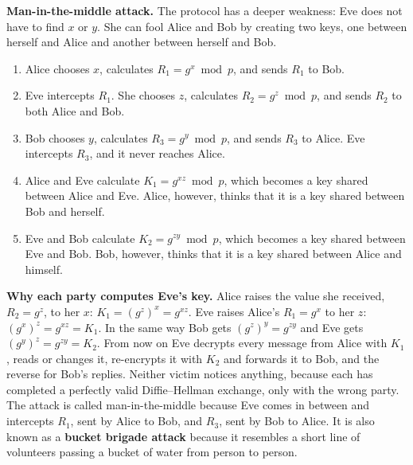 \textbf{Man-in-the-middle attack.} The protocol has a deeper weakness: Eve does not have to find $x$ or $y$. She can fool Alice and Bob by creating two keys, one between herself and Alice and another between herself and Bob.
\begin{enumerate}
  \item Alice chooses $x$, calculates $R_1 = g^x \bmod p$, and sends $R_1$ to Bob.
  \item Eve intercepts $R_1$. She chooses $z$, calculates $R_2 = g^z \bmod p$, and sends $R_2$ to both Alice and Bob.
  \item Bob chooses $y$, calculates $R_3 = g^y \bmod p$, and sends $R_3$ to Alice. Eve intercepts $R_3$, and it never reaches Alice.
  \item Alice and Eve calculate $K_1 = g^{xz} \bmod p$, which becomes a key shared between Alice and Eve. Alice, however, thinks that it is a key shared between Bob and herself.
  \item Eve and Bob calculate $K_2 = g^{zy} \bmod p$, which becomes a key shared between Eve and Bob. Bob, however, thinks that it is a key shared between Alice and himself.
\end{enumerate}
\begin{center}
\end{center}
\textbf{Why each party computes Eve's key.} Alice raises the value she received, $R_2 = g^z$, to her $x$: $K_1 = (g^z)^x = g^{xz}$. Eve raises Alice's $R_1 = g^x$ to her $z$: $(g^x)^z = g^{xz} = K_1$. In the same way Bob gets $(g^z)^y = g^{zy}$ and Eve gets $(g^y)^z = g^{zy} = K_2$. From now on Eve decrypts every message from Alice with $K_1$, reads or changes it, re-encrypts it with $K_2$ and forwards it to Bob, and the reverse for Bob's replies. Neither victim notices anything, because each has completed a perfectly valid Diffie--Hellman exchange, only with the wrong party. The attack is called man-in-the-middle because Eve comes in between and intercepts $R_1$, sent by Alice to Bob, and $R_3$, sent by Bob to Alice. It is also known as a \textbf{bucket brigade attack} because it resembles a short line of volunteers passing a bucket of water from person to person.

